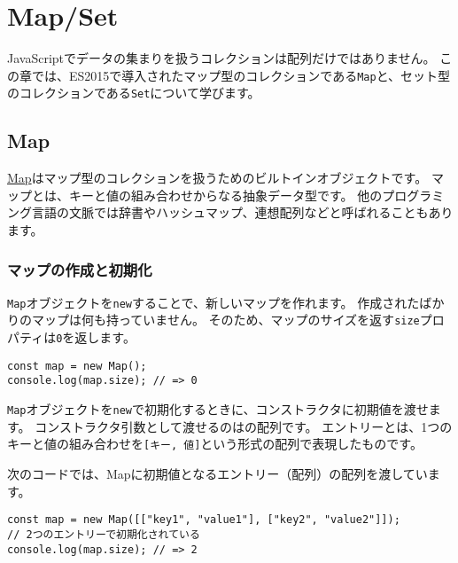 \hypertarget{map-and-set}{%
\chapter[Map/Set]{Map/Set\,\protect{}}\label{map-and-set}}
\thispagestyle{frontheadings}

JavaScriptでデータの集まりを扱うコレクションは配列だけではありません。
この章では、ES2015で導入されたマップ型のコレクションである\texttt{Map}と、セット型のコレクションである\texttt{Set}について学びます。

\hypertarget{map}{%
\section{Map}\label{map}}

\href{https://developer.mozilla.org/ja/docs/Web/JavaScript/Reference/Global_Objects/Map}{Map}はマップ型のコレクションを扱うためのビルトインオブジェクトです。
マップとは、キーと値の組み合わせからなる抽象データ型です。
他のプログラミング言語の文脈では辞書やハッシュマップ、連想配列などと呼ばれることもあります。

\hypertarget{map-new}{%
\subsection{マップの作成と初期化}\label{map-new}}

\texttt{Map}オブジェクトを\texttt{new}することで、新しいマップを作れます。
作成されたばかりのマップは何も持っていません。
そのため、マップのサイズを返す\texttt{size}プロパティは\texttt{0}を返します。

\begin{lstlisting}
const map = new Map();
console.log(map.size); // => 0
\end{lstlisting}

\texttt{Map}オブジェクトを\texttt{new}で初期化するときに、コンストラクタに初期値を渡せます。
コンストラクタ引数として渡せるのは\textbf{}の配列です。
エントリーとは、1つのキーと値の組み合わせを\texttt{[キー, 値]}という形式の配列で表現したものです。

次のコードでは、Mapに初期値となるエントリー（配列）の配列を渡しています。

\begin{lstlisting}
const map = new Map([["key1", "value1"], ["key2", "value2"]]);
// 2つのエントリーで初期化されている
console.log(map.size); // => 2
\end{lstlisting}

